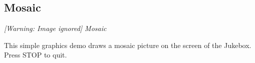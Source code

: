 \subsection{Mosaic}
{\centering\itshape
  [Warning: Image ignored] %
 \newline
Mosaic
\par}

This simple graphics demo draws a mosaic picture on the screen of the
Jukebox.  Press STOP to quit.


